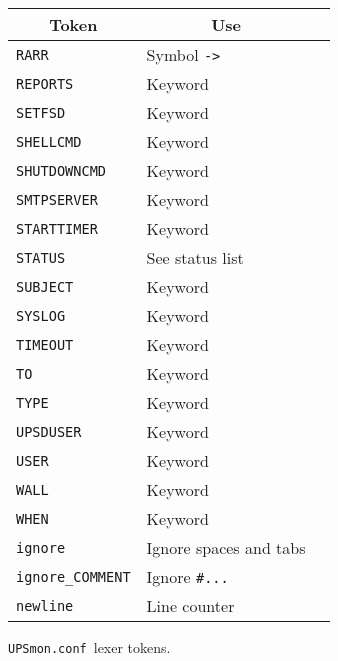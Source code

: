 \documentclass[12pt]{article}
\newcommand{\UPSmonconf}{\textcolor{UPSMONCOLOUR}{\texttt{UPSmon.conf}}}
\begin{document}
\begin{figure}[ht]
\begin{center}
\begin{tabular}{|l|l|p{0.4\LinePrinterwidth}|}
\hline
\multicolumn{1}{|c|}{\textbf{Token}} & \multicolumn{1}{|c|}{\textbf{Use}} \\ \hline\hline
\texttt{RARR}            & Symbol \texttt{->}     \\ \hline
\texttt{REPORTS}         & Keyword                \\ \hline
\texttt{SETFSD}          & Keyword                \\ \hline
\texttt{SHELLCMD}        & Keyword                \\ \hline
\texttt{SHUTDOWNCMD}     & Keyword                \\ \hline
\texttt{SMTPSERVER}      & Keyword                \\ \hline
\texttt{STARTTIMER}      & Keyword                \\ \hline
\texttt{STATUS}          & See status list        \\ \hline
\texttt{SUBJECT}         & Keyword                \\ \hline
\texttt{SYSLOG}          & Keyword                \\ \hline
\texttt{TIMEOUT}         & Keyword                \\ \hline
\texttt{TO}              & Keyword                \\ \hline
\texttt{TYPE}            & Keyword                \\ \hline
\texttt{UPSDUSER}        & Keyword                \\ \hline
\texttt{USER}            & Keyword                \\ \hline
\texttt{WALL}            & Keyword                \\ \hline
\texttt{WHEN}            & Keyword                \\ \hline
\texttt{ignore}          & Ignore spaces and tabs \\ \hline  
\texttt{ignore\_COMMENT} & Ignore \texttt{\#...}  \\ \hline  
\texttt{newline}         & Line counter           \\ \hline 
\end{tabular}
\caption{\UPSmonconf\ lexer tokens.\label{fig:tokens}}
\end{center}
\end{figure}

\vspace*{\fill}
\begin{center}
\end{center}
\end{document}
